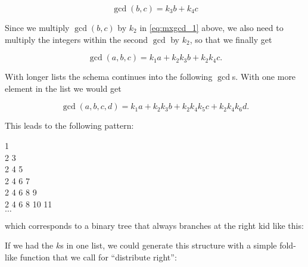 \documentclass{scrreprt}
\begin{document}
\begin{equation}
\gcd(b,c) = k_3b + k_4c
\end{equation}

Since we multiply $\gcd(b,c)$ by $k_2$ in
\ref{eq:mxgcd_1} above, we also need to
multiply the integers within
the second $\gcd$ by $k_2$,
so that we finally get

\begin{equation}
\gcd(a,b,c) = k_1a + k_2k_3b + k_2k_4c.
\end{equation}

With longer lists the schema continues
into the following $\gcd$s.
With one more element in the list we would get

\begin{equation}
\gcd(a,b,c,d) = k_1a + k_2k_3b + k_2k_4k_5c + k_2k_4k_6d.
\end{equation}

This leads to the following pattern:

1\\
2 3\\
2 4 5\\
2 4 6 7\\
2 4 6 8 9\\
2 4 6 8 10 11 \\
$\dots$

which corresponds to a binary tree that always branches
at the right kid like this:

\begin{center}
\end{center}

If we had the $k$s in one list, we could generate
this structure with a simple fold-like function
that we call  for ``distribute right'':
\end{document}
